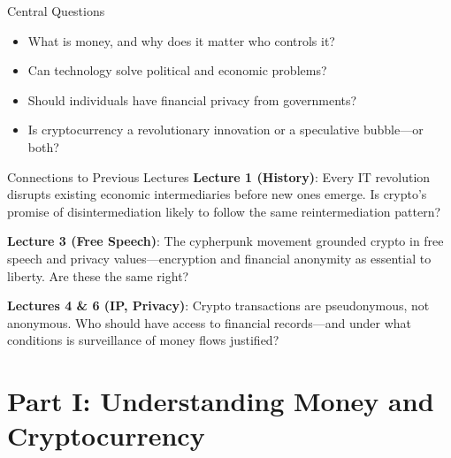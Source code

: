 ﻿\documentclass[aspectratio=169,11pt]{beamer}
\begin{document}
\begin{frame}{Central Questions}
\begin{itemize}
    \item What is money, and why does it matter who controls it?
    \item Can technology solve political and economic problems?
    \item Should individuals have financial privacy from governments?
    \item Is cryptocurrency a revolutionary innovation or a speculative bubble---or both?
\end{itemize}
\end{frame}

\begin{frame}{Connections to Previous Lectures}
\textbf{Lecture 1 (History)}: Every IT revolution disrupts existing economic intermediaries before new ones emerge. Is crypto's promise of disintermediation likely to follow the same reintermediation pattern?

\vspace{0.2cm}
\textbf{Lecture 3 (Free Speech)}: The cypherpunk movement grounded crypto in free speech and privacy values---encryption and financial anonymity as essential to liberty. Are these the same right?

\vspace{0.2cm}
\textbf{Lectures 4 \& 6 (IP, Privacy)}: Crypto transactions are pseudonymous, not anonymous. Who should have access to financial records---and under what conditions is surveillance of money flows justified?
\end{frame}

\section{Part I: Understanding Money and Cryptocurrency}

\end{document}

